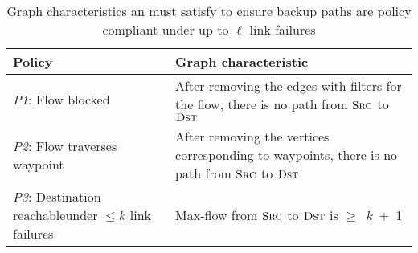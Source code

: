 \begin{table}
\footnotesize
\setlength{\tabcolsep}{0.2em}
\begin{tabular}{p{}p{}}
{\bf Policy} & {\bf Graph characteristic} \\
\hline
{\em P1}: Flow blocked & After removing the edges with filters for the flow, there is no
path from $\textsc{Src}$ to $\textsc{Dst}$ \\
\hline
{\em P2}: Flow traverses waypoint & After removing the vertices corresponding to
waypoints, there is no path from $\textsc{Src}$ to $\textsc{Dst}$ \\
\hline
{\em P3}: Destination reachable\newline under $\leq k$ link failures & Max-flow from
$\textsc{Src}$ to $\textsc{Dst}$ is $\geq$~$k$~+~1 \\
\hline
\end{tabular}
\label{t:policy_characteristics}
\caption{Graph characteristics an \ARC must satisfy to ensure backup paths
are policy compliant under up to $\ell$ link failures}
\end{table}
